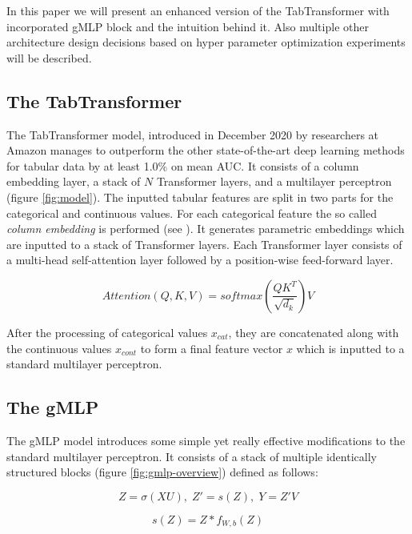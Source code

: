 \documentclass{article}
\begin{document}
In this paper we will present an enhanced version of the TabTransformer with incorporated gMLP block and the intuition behind it. Also multiple other architecture design decisions based on hyper parameter optimization experiments will be described.

\subsection{The TabTransformer}
\label{sec:tabtransformer}

The TabTransformer model, introduced in December 2020 by researchers at Amazon manages to outperform the other state-of-the-art deep learning methods for tabular data by at least 1.0\% on mean AUC. It consists of a column embedding layer, a stack of $N$ Transformer layers, and a multilayer perceptron (figure \ref{fig:model}). The inputted tabular features are split in two parts for the categorical and continuous values. For each categorical feature the so called \textit{column embedding} is performed (see \cite{Huang2020TabTransformerTD}). It generates parametric embeddings which are inputted to a stack of Transformer layers. Each Transformer layer \cite{vaswani2017attention} consists of a multi-head self-attention layer followed by a position-wise feed-forward layer.

\begin{equation}
    Attention(Q, K, V) = softmax(\frac{QK^T}{\sqrt{d_k}})V
\end{equation}

After the processing of categorical values $x_{cat}$, they are concatenated along with the continuous values $x_{cont}$ to form a final feature vector $x$ which is inputted to a standard  multilayer perceptron.

\subsection{The gMLP}
\label{sec:gmlp}

The gMLP model \cite{Liu2021PayAT} introduces some simple yet really effective modifications to the standard multilayer perceptron. It consists of a stack of multiple identically structured blocks (figure \ref{fig:gmlp-overview}) defined as follows:

\begin{equation}
    Z = \sigma(XU), \; Z' = s(Z), \; Y = Z'V
\end{equation}

\begin{equation}
    s(Z) = Z * f_{W,b}(Z)
\end{equation}
\end{document}
